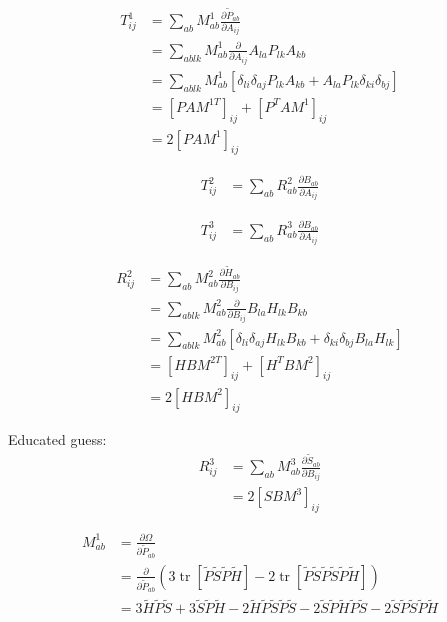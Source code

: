 \documentclass{article}
\newcommand{\tr}{\operatorname{tr}}
\begin{document}
\begin{align*}
T^1_{ij} &= \sum_{ab} M^1_{ab} \frac{\partial \tilde P_{ab}}{\partial A_{ij}} \\
         &= \sum_{ablk} M^1_{ab} \frac{\partial}{\partial A_{ij}} A_{la} P_{lk}  A_{kb} \\
         &= \sum_{ablk} M^1_{ab} \left [ \delta_{li} \delta_{aj} P_{lk}  A_{kb} + A_{la} P_{lk} \delta_{ki} \delta_{bj} \right ]\\
         &= \left [ P A M^{1T} \right ]_{ij}  +  \left [ P^T A M^1 \right ]_{ij} \\
         &= 2 \left [ P A M^{1} \right ]_{ij}
\end{align*}

\begin{align*}
T^2_{ij} &= \sum_{ab} R^2_{ab} \frac{\partial B_{ab}}{\partial A_{ij}}
\end{align*}

\begin{align*}
T^3_{ij} &= \sum_{ab} R^3_{ab} \frac{\partial B_{ab}}{\partial A_{ij}}
\end{align*}

\newpage

\begin{align*}
R^2_{ij} &= \sum_{ab} M^2_{ab} \frac{\partial \tilde H_{ab}}{\partial B_{ij}} \\
         &= \sum_{ablk} M^2_{ab} \frac{\partial}{\partial B_{ij}} B_{la} H_{lk} B_{kb} \\
         &= \sum_{ablk} M^2_{ab} \left [ \delta_{li} \delta_{aj} H_{lk} B_{kb}  +  \delta_{ki} \delta_{bj} B_{la} H_{lk} \right] \\
         &= \left [H B M^{2T} \right]_{ij} + \left [ H^{T}B M^2 \right ]_{ij}  \\
         &= 2 \left [H B M^{2} \right]_{ij}
\end{align*}

Educated guess:
\begin{align*}
R^3_{ij} &= \sum_{ab} M^3_{ab} \frac{\partial \tilde S_{ab}}{\partial B_{ij}}\\
         &= 2 \left [S B M^{3} \right]_{ij}
\end{align*}

\newpage

\begin{align*}
    M^1_{ab} &= \frac{\partial \Omega}{\partial \tilde P_{ab}}\\
    & = \frac{\partial}{\partial \tilde P_{ab}} \left (3\tr[\tilde P \tilde S \tilde P \tilde H ] - 2\tr[\tilde P \tilde S \tilde P \tilde S \tilde P \tilde H] \right )\\
    & = 3 \tilde H \tilde P \tilde S  + 3 \tilde S \tilde  P \tilde H        -2 \tilde H\tilde P\tilde S\tilde P\tilde S   -2 \tilde S\tilde P\tilde H\tilde P\tilde S  -2\tilde  S\tilde P\tilde S\tilde P\tilde H
\end{align*}
\end{document}
